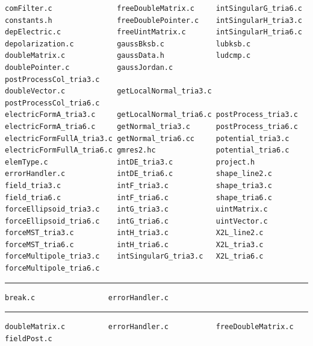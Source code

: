 \documentclass[12pt]{article}
\begin{document}
\small\begin{verbatim}
comFilter.c               freeDoubleMatrix.c     intSingularG_tria6.c
constants.h               freeDoublePointer.c    intSingularH_tria3.c
depElectric.c             freeUintMatrix.c       intSingularH_tria6.c
depolarization.c          gaussBksb.c            lubksb.c
doubleMatrix.c            gaussData.h            ludcmp.c
doublePointer.c           gaussJordan.c          postProcessCol_tria3.c
doubleVector.c            getLocalNormal_tria3.c postProcessCol_tria6.c
electricFormA_tria3.c     getLocalNormal_tria6.c postProcess_tria3.c
electricFormA_tria6.c     getNormal_tria3.c      postProcess_tria6.c
electricFormFullA_tria3.c getNormal_tria6.cc     potential_tria3.c
electricFormFullA_tria6.c gmres2.hc              potential_tria6.c
elemType.c                intDE_tria3.c          project.h
errorHandler.c            intDE_tria6.c          shape_line2.c
field_tria3.c             intF_tria3.c           shape_tria3.c
field_tria6.c             intF_tria6.c           shape_tria6.c
forceEllipsoid_tria3.c    intG_tria3.c           uintMatrix.c
forceEllipsoid_tria6.c    intG_tria6.c           uintVector.c
forceMST_tria3.c          intH_tria3.c           X2L_line2.c
forceMST_tria6.c          intH_tria6.c           X2L_tria3.c
forceMultipole_tria3.c    intSingularG_tria3.c   X2L_tria6.c
forceMultipole_tria6.c
\end{verbatim}\normalsize

\hrule


\small\begin{verbatim}
break.c                 errorHandler.c
\end{verbatim}\normalsize
\hrule
\pagebreak


\small\begin{verbatim}
doubleMatrix.c          errorHandler.c           freeDoubleMatrix.c
fieldPost.c
\end{verbatim}\normalsize
\end{document}
